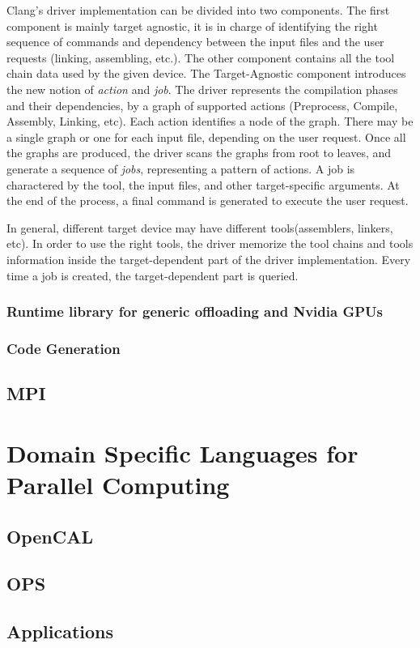 Clang's driver implementation can be divided into two components. The first component is mainly target agnostic, it is in charge of identifying the right sequence of commands and dependency between the input files and the user requests (linking, assembling, etc.). The other component contains all the tool chain data used by the given device.
The Target-Agnostic component introduces the new notion of \emph{action} and \emph{job}. The driver represents the compilation phases and their dependencies, by a graph of supported actions (Preprocess, Compile, Assembly, Linking, etc). Each action identifies a node of the graph. There may be a single graph or one for each input file, depending on the user request. Once all the graphs are produced, the driver scans the graphs from root to leaves, and generate a sequence of \emph{jobs}, representing a pattern of actions. A job is charactered by the tool, the input files, and other target-specific arguments. At the end of the process, a final command is generated to execute the user request.

In general, different target device may have different tools(assemblers, linkers, etc). In order to use the right tools, the driver memorize the tool chains and tools information inside the target-dependent part of the driver implementation. Every time a job is created, the target-dependent part is queried. 

\subsection{Runtime library for generic offloading and Nvidia GPUs}

\subsection{Code Generation}

\section{MPI}

\chapter{Domain Specific Languages for Parallel Computing}

\section{OpenCAL}

\section{OPS}

\section{Applications}
